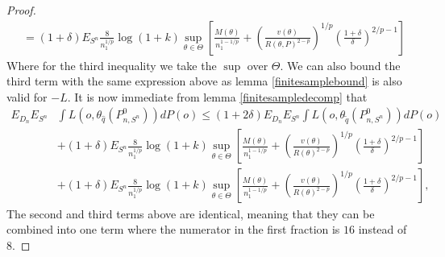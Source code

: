 \documentclass[11pt, a4paper]{article}
\theoremstyle{definition}
\theoremstyle{remark}
\newcommand{\q}{q}
\newcommand{\btheta}{\theta}
\newcommand{\Sn}{S^n}
\begin{document}
\begin{proof}[Proof]
\begin{align*}
&= (1 + \delta) E_{\Sn}\frac{8}{n_1^{1/p}} \log(1 + k) \sup_{\btheta \in \Theta} \left[ \frac{M(\btheta)}{n_1^{1-1/p}} + \left( \frac{v(\btheta)}{R(\btheta,P)^{2-p}} \right)^{1/p}\left( \frac{1 + \delta}{\delta}  \right)^{2/p-1} \right]  
\end{align*}
Where for the third inequality we take the $ \sup $ over $ \Theta $. We can also bound the third term with the same expression above as lemma \ref{finitesamplebound} is also valid for $ -L $. It is now immediate from lemma \ref{finitesampledecomp} that 
\begin{align*}
    E_{D_n} E_{\Sn} &\int L(o, \btheta_{ \hat{\q} }(P_{n, \Sn}^{0})) d P(o) \leq (1 + 2 \delta) E_{D_n} E_{\Sn} \int L(o, \btheta_{ \tilde{\q} }(P_{n, \Sn}^{0})) d P(o) \\
                    &+ (1 + \delta) E_{\Sn}\frac{8}{n_1^{1/p}} \log(1 + k) \sup_{\btheta \in \Theta} \left[ \frac{M(\btheta)}{n_1^{1-1/p}} + \left( \frac{v(\btheta)}{R(\btheta)^{2-p}} \right)^{1/p}\left( \frac{1 + \delta}{\delta}  \right)^{2/p-1} \right]\\
                    &+ (1 + \delta) E_{\Sn}\frac{8}{n_1^{1/p}} \log(1 + k) \sup_{\btheta \in \Theta} \left[ \frac{M(\btheta)}{n_1^{1-1/p}} + \left( \frac{v(\btheta)}{R(\btheta)^{2-p}} \right)^{1/p}\left( \frac{1 + \delta}{\delta}  \right)^{2/p-1} \right],
\end{align*}
The second and third terms above are identical, meaning that they can be combined into one term where the numerator in the first fraction is $ 16 $ instead of $ 8 $. 
\end{proof}
\end{document}
